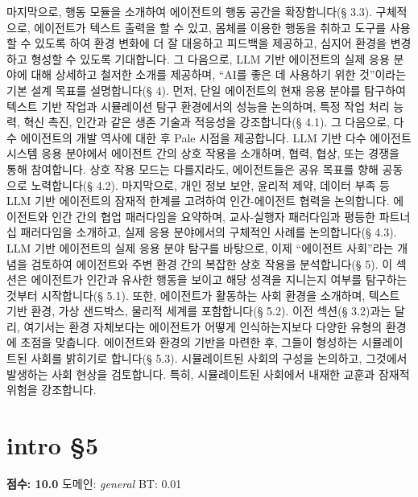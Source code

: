 \documentclass[11pt,a4paper,oneside]{memoir}
\begin{document}
\begin{tcolorbox}[kostyle]
마지막으로, 행동 모듈을 소개하여 에이전트의 행동 공간을 확장합니다(§ 3.3). 구체적으로, 에이전트가 텍스트 출력을 할 수 있고, 몸체를 이용한 행동을 취하고 도구를 사용할 수 있도록 하여 환경 변화에 더 잘 대응하고 피드백을 제공하고, 심지어 환경을 변경하고 형성할 수 있도록 기대합니다. 그 다음으로, LLM 기반 에이전트의 실제 응용 분야에 대해 상세하고 철저한 소개를 제공하며, “AI를 좋은 데 사용하기 위한 것”이라는 기본 설계 목표를 설명합니다(§ 4). 먼저, 단일 에이전트의 현재 응용 분야를 탐구하여 텍스트 기반 작업과 시뮬레이션 탐구 환경에서의 성능을 논의하며, 특정 작업 처리 능력, 혁신 촉진, 인간과 같은 생존 기술과 적응성을 강조합니다(§ 4.1). 그 다음으로, 다수 에이전트의 개발 역사에 대한 후 Pale 시점을 제공합니다. LLM 기반 다수 에이전트 시스템 응용 분야에서 에이전트 간의 상호 작용을 소개하며, 협력, 협상, 또는 경쟁을 통해 참여합니다. 상호 작용 모드는 다를지라도, 에이전트들은 공유 목표를 향해 공동으로 노력합니다(§ 4.2). 마지막으로, 개인 정보 보안, 윤리적 제약, 데이터 부족 등 LLM 기반 에이전트의 잠재적 한계를 고려하여 인간-에이전트 협력을 논의합니다. 에이전트와 인간 간의 협업 패러다임을 요약하며, 교사-실행자 패러다임과 평등한 파트너십 패러다임을 소개하고, 실제 응용 분야에서의 구체적인 사례를 논의합니다(§ 4.3). LLM 기반 에이전트의 실제 응용 분야 탐구를 바탕으로, 이제 “에이전트 사회”라는 개념을 검토하여 에이전트와 주변 환경 간의 복잡한 상호 작용을 분석합니다(§ 5). 이 섹션은 에이전트가 인간과 유사한 행동을 보이고 해당 성격을 지니는지 여부를 탐구하는 것부터 시작합니다(§ 5.1). 또한, 에이전트가 활동하는 사회 환경을 소개하며, 텍스트 기반 환경, 가상 샌드박스, 물리적 세계를 포함합니다(§ 5.2). 이전 섹션(§ 3.2)과는 달리, 여기서는 환경 자체보다는 에이전트가 어떻게 인식하는지보다 다양한 유형의 환경에 초점을 맞춥니다. 에이전트와 환경의 기반을 마련한 후, 그들이 형성하는 시뮬레이트된 사회를 밝히기로 합니다(§ 5.3). 시뮬레이트된 사회의 구성을 논의하고, 그것에서 발생하는 사회 현상을 검토합니다. 특히, 시뮬레이트된 사회에서 내재한 교훈과 잠재적 위험을 강조합니다.
\end{tcolorbox}
\vspace{0.8em}

\section{intro §5}
\noindent \textbf{\color{ScoreRed}점수: 10.0} \quad 도메인: \textit{general}  \quad \textcolor{ScoreRed}{BT: 0.01}
\vspace{0.4em}
\end{document}
